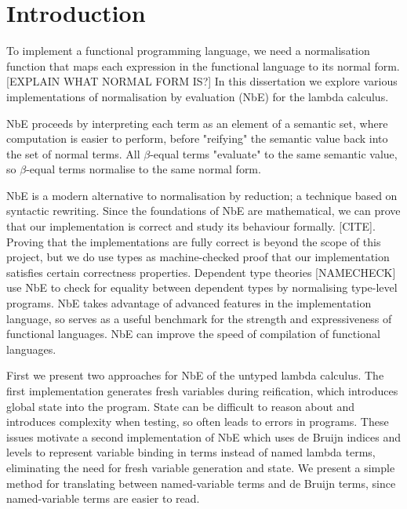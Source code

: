 \chapter{Introduction}
\label{chap:introduction}

To implement a functional programming language, we need a normalisation function that maps each expression in the functional language to its normal form. [EXPLAIN WHAT NORMAL FORM IS?]
In this dissertation we explore various implementations of normalisation by evaluation (NbE) for the lambda calculus.

NbE proceeds by interpreting each term as an element of a semantic set, where computation is easier to perform, before "reifying" the semantic value back into the set of normal terms. All $\beta$-equal terms "evaluate" to the same semantic value, so $\beta$-equal terms normalise to the same normal form.

NbE is a modern alternative to normalisation by reduction; a technique based on syntactic rewriting. Since the foundations of NbE are mathematical, we can prove that our implementation is correct and study its behaviour formally. [CITE]. Proving that the implementations are fully correct is beyond the scope of this project, but we do use types as machine-checked proof that our implementation satisfies certain correctness properties.
Dependent type theories [NAMECHECK] use NbE to check for equality between dependent types by normalising type-level programs.
NbE takes advantage of advanced features in the implementation language, so serves as a useful benchmark for the strength and expressiveness of functional languages.
NbE can improve the speed of compilation of functional languages. \cite{efficientNbE}

First we present two approaches for NbE of the untyped lambda calculus. The first implementation generates fresh variables during reification, which introduces global state into the program. State can be difficult to reason about and introduces complexity when testing, so often leads to errors in programs. These issues motivate a second implementation of NbE which uses de Bruijn indices and levels to represent variable binding in terms instead of named lambda terms, eliminating the need for fresh variable generation and state. We present a simple method for translating between named-variable terms and de Bruijn terms, since named-variable terms are easier to read. 

